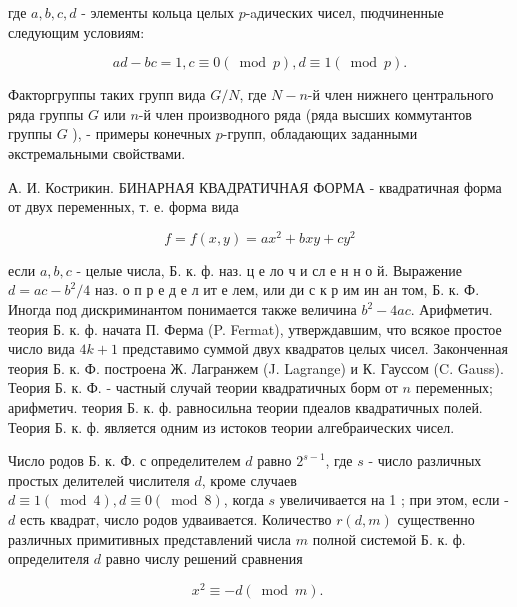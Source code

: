 \documentclass[10pt]{article}
\begin{document}
где $a, b, c, d$ - элементы кольца целых $p$-aдических чисел, пюдчиненные следующим условиям:



\[

a d-b c=1, c \equiv 0(\bmod p), d \equiv 1(\bmod p) .

\]



Факторгруппы таких групп вида $G / N$, где $N-n$-й член нижнего центрального ряда группы $G$ или $n$-й член производного ряда (ряда высших коммутантов группы $G$ ), - примеры конечных $p$-групп, обладающих заданными әкстремальными свойствами.



А. И. Кострикин. БИНАРНАЯ КВАДРАТИЧНАЯ ФОРМА - квадратичная форма от двух переменных, т. е. форма вида



\[

f=f(x, y)=a x^{2}+b x y+c y^{2}

\]



если $a, b, c$ - целые числа, Б. к. ф. наз. ц е ло ч и сл е н н о й. Выражение $d=a c-b^{2} / 4$ наз. о п р е д е л ит е лем, или ди с к р им ин ан том, Б. к. Ф. Иногда под дискриминантом понимается также величина $b^{2}-4 a c$. Арифметич. теория Б. к. ф. начата П. Ферма (P. Fermat), утверждавшим, что всякое простое число вида $4 k+1$ представимо суммой двух квадратов целых чисел. Законченная теория Б. к. Ф. построена Ж. Лагранжем (J. Lagrange) и К. Гауссом (C. Gauss). Теория Б. к. Ф. - частный случай теории квадратичных борм от $n$ переменных; арифметич. теория Б. к. ф. равносильна теории пдеалов квадратичных полей. Теория Б. к. ф. является одним из истоков теории алгебраических чисел.



Число родов Б. к. Ф. с определителем $d$ равно $2^{s-1}$, где $s$ - число различных простых делителей числителя $d$, кроме случаев $d \equiv 1(\bmod 4), d \equiv 0(\bmod 8)$, когда $s$ увеличивается на 1 ; при этом, если - $d$ есть квадрат, число родов удваивается. Количество $r(d, m)$ существенно различных примитивных представлений числа $m$ полной системой Б. к. ф. определителя $d$ равно числу решений сравнения



\[

x^{2} \equiv-d(\bmod m) \text {. }

\]
\end{document}
